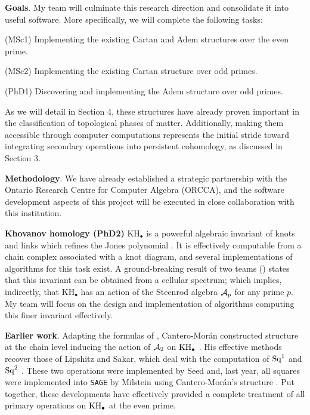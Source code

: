 \medskip\noindent\textbf{Goals}.
My team will culminate this research direction and consolidate it into useful software.
More specifically, we will complete the following tasks:

\smallskip\noindent(MSc1) Implementing the existing Cartan and Adem structures over the even prime.\par
\noindent(MSc2) Implementing the existing Cartan structure over odd primes.\par
\noindent(PhD1) Discovering and implementing the Adem structure over odd primes.

\smallskip\noindent As we will detail in Section 4, these structures have already proven important in the classification of topological phases of matter.
Additionally, making them accessible through computer computations represents the initial stride toward integrating secondary operations into persistent cohomology, as discussed in Section 3.

\smallskip\noindent\textbf{Methodology}.
We have already established a strategic partnership with the Ontario Research Centre for Computer Algebra (ORCCA), and the software development aspects of this project will be executed in close collaboration with this institution.

\medskip\noindent\textbf{{\sc Khovanov homology} (PhD2)}
$\mathrm{KH_\bullet}$ is a powerful algebraic invariant of knots and links which refines the Jones polynomial \cite{khovanov2000khovanov}.
It is effectively computable from a chain complex associated with a knot diagram, and several implementations of algorithms for this task exist.
A ground-breaking result of two teams (\cite{lipshitz2014khovanov,kriz2016khovanov}) states that this invariant can be obtained from a cellular spectrum; which implies, indirectly, that $\mathrm{KH_\bullet}$ has an action of the Steenrod algebra $\mathcal{A}_p$ for any prime $p$.
My team will focus on the design and implementation of algorithms computing this finer invariant effectively.

\medskip\noindent\textbf{Earlier work}.
Adapting the formulas of \cite{medina2023fast_sq}, Cantero-Mor\'an constructed structure at the chain level inducing the action of $\mathcal{A}_2$ on $\mathrm{KH}_\bullet$ \cite{cantero-moran2020khovanov}.
His effective methods recover those of Lipshitz and Sakar, which deal with the computation of $\operatorname{Sq}^1$ and $\operatorname{Sq}^2$ \cite{lipshitz2014steenrod}.
These two operations were implemented by Seed \cite{seed2012khovanov} and, last year, all squares were implemented into \texttt{SAGE} by Milstein using Cantero-Morán's structure \cite{milstein2022khovanov}.
Put together, these developments have effectively provided a complete treatment of all primary operations on $\mathrm{KH}_\bullet$ at the even prime.

